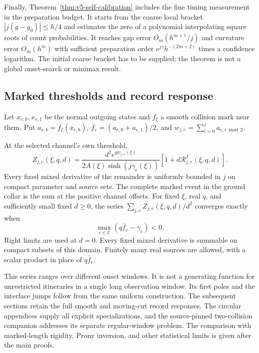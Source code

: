 Finally, Theorem~\ref{thm:v5-self-calibration} includes the fine timing
measurement in the preparation budget. It starts from the coarse local
bracket $|j(g-g_0)|\le h/4$ and estimates the zero of a polynomial
interpolating square roots of count probabilities. It reaches gap error
$O_m(h^{m+1}/j)$ and curvature error $O_m(h^m)$ with sufficient
preparation order $e^{j\gamma}h^{-(2m+2)}$ times a confidence logarithm.
The initial coarse bracket has to be supplied; the theorem is not a
global onset-search or minimax result.

\subsection{Marked thresholds and record response}
Let $x_{e,0},x_{e,1}$ be the normal outgoing states and $f_\xi$ a smooth
collision mark near them. Put $a_{e,b}=f_\xi(x_{e,b})$,
$\bar f_e=(a_{e,0}+a_{e,1})/2$, and
$w_{j,e}=\sum_{i=0}^j a_{e,i\bmod2}$.
\begin{theorem}
\label{thm:g-marked}
At the selected channel's own threshold,
\begin{equation}\label{eq:g-marked}
 Z_{j,e}(\xi,q,d)=
 \frac{d^2e^{qw_{j,e}(\xi)}}{2A(\xi)\sinh(j\gamma_e(\xi))}
       [1+d\mathcal R^f_{j,e}(\xi,q,d)].
\end{equation}
Every fixed mixed derivative of the remainder is uniformly bounded in
$j$ on compact parameter and source sets. The complete marked event in
the ground collar is the sum at the positive channel offsets. For fixed
$\xi$, real $q$, and sufficiently small fixed $d\ge0$, the series
$\sum_{j,e}Z_{j,e}(\xi,q,d)/d^2$ converges exactly when
\begin{equation}\label{eq:g-source-domain}
              \max_{e\in\mathcal E}(q\bar f_e-\gamma_e)<0.
\end{equation}
Right limits are used at $d=0$. Every fixed mixed derivative is summable
on compact subsets of this domain. Finitely many real sources are
allowed, with a scalar product in place of $q\bar f_e$.
\end{theorem}

This series ranges over different onset windows. It is not a generating
function for unrestricted itineraries in a single long observation
window. Its first poles and the interface jumps follow from the same
uniform construction. The subsequent sections retain the full smooth
and moving-cut record responses. The circular appendices supply all
explicit specializations, and the source-pinned two-collision companion
addresses its separate regular-window problem. The comparison with
marked-length rigidity, Prony inversion, and other statistical limits
is given after the main proofs.

